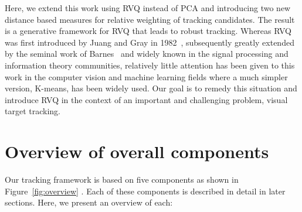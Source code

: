 Here, we extend this work using RVQ instead of PCA and introducing two new distance based measures for relative weighting of tracking candidates.  The result is a generative framework for RVQ that leads to robust tracking.  Whereas RVQ was first introduced by Juang and Gray in 1982~\cite{1982_CNF_SpeechRVQ_JuangGray}, subsequently greatly extended by the seminal work of Barnes~\cite{1991_CNF_DesignPerformanceRVQ_Frost,1992_JNL_RVQ_Barnes,1992_CNF_ImageCodingRVQ_Kossentini,1993_sigmaTrees_Barnes,1993_JNL_RVQDSC_Barnes,1995_JNL_OptimalityRVQ_Kossentini,1996_CNF_VQclassification_Barnes,1996_JNL_AdvancesRVQ_Barnes,2002_JNL_SigmaTrees_Barnes,2004_CNF_DSSAdataMining_Barnes,2007_JNL_Katrina_Barnes,2007_JNL_IDDM_Barnes} and widely known in the signal processing and information theory communities, relatively little attention has been given to this work in the computer vision and machine learning fields where a much simpler version, K-means, has been widely used.  Our goal is to remedy this situation and introduce RVQ in the context of an important and challenging problem, visual target tracking.

\section{Overview of overall components}
Our tracking framework is based on five components as shown in Figure~\ref{fig:overview} .  Each of these components is described in detail in later sections.  Here, we present an overview of each:

